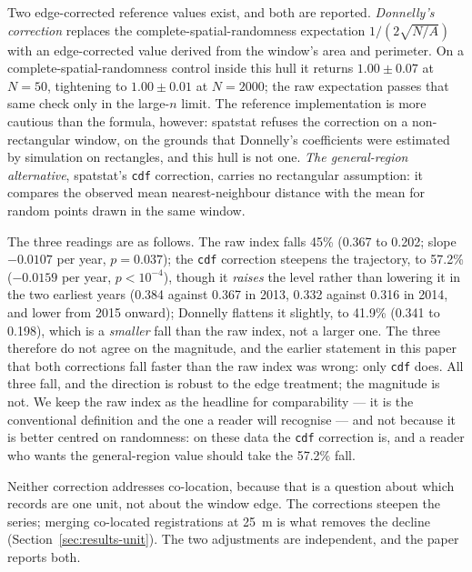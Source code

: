 \documentclass{article}
\newcommand{\hullLocOlsP}{0.037}
\newcommand{\locHullDrop}{45}
\begin{document}
Two edge-corrected reference values exist, and both are reported.
\emph{Donnelly's correction} \cite{donnelly1978simulations} replaces the
complete-spatial-randomness expectation
$1/(2\sqrt{N/A})$ with an edge-corrected value derived from the window's area and perimeter. On a
complete-spatial-randomness control inside this hull it returns $\num{1.00} \pm \num{0.07}$ at
$N = 50$, tightening to $\num{1.00} \pm \num{0.01}$ at $N = 2000$; the raw expectation passes
that same check only in the large-$n$ limit. The reference implementation
\cite{baddeley2005spatstat} is more cautious than
the formula, however: \textsf{spatstat} refuses the correction on a non-rectangular window, on the
grounds that Donnelly's coefficients were estimated by simulation on rectangles, and this hull is
not one. \emph{The general-region alternative}, \textsf{spatstat}'s \texttt{cdf} correction,
carries no rectangular assumption: it compares the observed mean nearest-neighbour distance with
the mean for random points drawn in the same window.

The three readings are as follows. The raw index falls \locHullDrop\% (\num{0.367} to
\num{0.202}; slope $-0.0107$ per year, $p = \hullLocOlsP$); the \texttt{cdf} correction
steepens the trajectory, to \num{57.2}\% ($-0.0159$ per year, $p < 10^{-4}$), though it
\emph{raises} the level rather than lowering it in the two earliest years
(\num{0.384} against \num{0.367} in 2013, \num{0.332} against \num{0.316} in 2014, and lower
from 2015 onward); Donnelly flattens it slightly, to \num{41.9}\% (\num{0.341} to
\num{0.198}), which is a \emph{smaller} fall than the raw index, not a larger one. The three
therefore do not agree on the magnitude, and the earlier statement in this paper that both
corrections fall faster than the raw index was wrong: only \texttt{cdf} does. All three fall, and
the direction is robust to the edge treatment; the magnitude is not. We keep the raw index as
the headline for comparability --- it is the
conventional definition and the one a reader will recognise --- and not because it is better
centred on randomness: on these data the \texttt{cdf} correction is, and a reader who wants the
general-region value should take the \num{57.2}\% fall.

Neither correction addresses co-location, because that is a question about which records are one
unit, not about the window edge. The corrections steepen the series; merging co-located
registrations at \SI{25}{\meter} is what removes the decline (Section~\ref{sec:results-unit}).
The two adjustments are independent, and the paper reports both.
\end{document}
